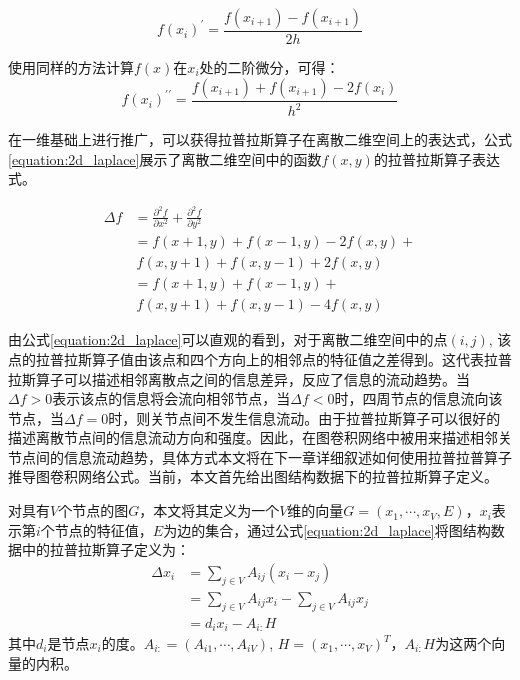 \begin{equation}
    f(x_i)^{\prime} = \frac{ f(x_{i+1}) - f(x_{i+1}) }{2h} 
    \label{equation:frist_order}
\end{equation}

使用同样的方法计算$f(x)$在$x_i$处的二阶微分，可得：
\begin{equation}
    f(x_i)^{\prime \prime} = \frac{ f(x_{i+1}) + f(x_{i+1}) - 2f(x_i) }{h^2} 
    \label{equation:second_order}
\end{equation}

在一维基础上进行推广，可以获得拉普拉斯算子在离散二维空间上的表达式，公式\ref{equation:2d_laplace}展示了离散二维空间中的函数$f(x,y)$的拉普拉斯算子表达式。

\begin{equation}
    \begin{aligned}
        \Delta f &= \frac{\partial^2 f}{\partial x^2} + \frac{\partial^2 f}{\partial y^2} \\
        &= f(x+1, y) + f(x-1, y) - 2f(x, y) + \\
        &\ f(x, y+1) + f(x, y-1) + 2f(x, y) \\
        &= f(x+1, y) + f(x-1, y) + \\
        &\ f(x, y+1) + f(x, y-1) - 4f(x,y)
    \end{aligned}
    \label{equation:2d_laplace}
\end{equation}

由公式\ref{equation:2d_laplace}可以直观的看到，对于离散二维空间中的点$(i,j)$, 该点的拉普拉斯算子值由该点和四个方向上的相邻点的特征值之差得到。这代表拉普拉斯算子可以描述相邻离散点之间的信息差异，反应了信息的流动趋势。当$\Delta f > 0$表示该点的信息将会流向相邻节点，当$\Delta f < 0$时，四周节点的信息流向该节点，当$\Delta f = 0$时，则关节点间不发生信息流动。由于拉普拉斯算子可以很好的描述离散节点间的信息流动方向和强度。因此，在图卷积网络中被用来描述相邻关节点间的信息流动趋势，具体方式本文将在下一章详细叙述如何使用拉普拉普算子推导图卷积网络公式。当前，本文首先给出图结构数据下的拉普拉斯算子定义。

对具有$V$个节点的图$G$，本文将其定义为一个$V$维的向量$G=(x_1, \cdots, x_V, E)$，$x_i$表示第$i$个节点的特征值，$E$为边的集合，通过公式\ref{equation:2d_laplace}将图结构数据中的拉普拉斯算子定义为：
\begin{equation}
    \begin{aligned}
        \Delta x_i &= \sum_{j \in V}A_{ij}(x_i - x_j) \\
        &=\sum_{j \in V}A_{ij}x_i - \sum_{j \in V}A_{ij}x_j \\
        &= d_i x_i - A_{i:}H
    \end{aligned}
    \label{equation:nd_laplace}
\end{equation}
其中$d_i$是节点$x_i$的度。$A_{i:} = (A_{i1},\cdots, A_{iV})$, $H = (x_1, \cdots, x_V)^T$，$A_{i:}H$为这两个向量的内积。

